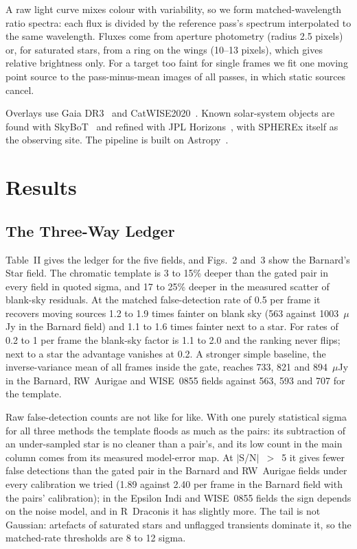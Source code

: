 \documentclass[conference]{IEEEtran}
\begin{document}
A raw light curve mixes colour with variability, so we form matched-wavelength ratio spectra: each flux is divided by the reference pass's spectrum interpolated to the same wavelength. Fluxes come from aperture photometry (radius 2.5 pixels) or, for saturated stars, from a ring on the wings (10--13 pixels), which gives relative brightness only. For a target too faint for single frames we fit one moving point source to the pass-minus-mean images of all passes, in which static sources cancel.

Overlays use Gaia DR3~\cite{gaia2023} and CatWISE2020~\cite{marocco2021}. Known solar-system objects are found with SkyBoT~\cite{berthier2016} and refined with JPL Horizons~\cite{horizons}, with SPHEREx itself as the observing site. The pipeline is built on Astropy~\cite{astropy2022}.

\section{Results}

\subsection{The Three-Way Ledger}

Table~II gives the ledger for the five fields, and Figs.~2 and~3 show the Barnard's Star field. The chromatic template is 3 to 15\% deeper than the gated pair in every field in quoted sigma, and 17 to 25\% deeper in the measured scatter of blank-sky residuals. At the matched false-detection rate of 0.5 per frame it recovers moving sources 1.2 to 1.9 times fainter on blank sky (563 against 1003~$\mu$Jy in the Barnard field) and 1.1 to 1.6 times fainter next to a star. For rates of 0.2 to 1 per frame the blank-sky factor is 1.1 to 2.0 and the ranking never flips; next to a star the advantage vanishes at 0.2. A stronger simple baseline, the inverse-variance mean of all frames inside the gate, reaches 733, 821 and 894~$\mu$Jy in the Barnard, RW~Aurigae and WISE~0855 fields against 563, 593 and 707 for the template.

Raw false-detection counts are not like for like. With one purely statistical sigma for all three methods the template floods as much as the pairs: its subtraction of an under-sampled star is no cleaner than a pair's, and its low count in the main column comes from its measured model-error map. At $|$S/N$|$~$>$~5 it gives fewer false detections than the gated pair in the Barnard and RW~Aurigae fields under every calibration we tried (1.89 against 2.40 per frame in the Barnard field with the pairs' calibration); in the Epsilon Indi and WISE~0855 fields the sign depends on the noise model, and in R~Draconis it has slightly more. The tail is not Gaussian: artefacts of saturated stars and unflagged transients dominate it, so the matched-rate thresholds are 8 to 12 sigma.
\end{document}
